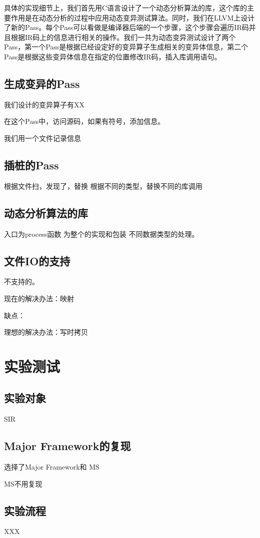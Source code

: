 \documentclass[nofonts]{ctexrep}
\begin{document}
具体的实现细节上，我们首先用C语言设计了一个动态分析算法的库，这个库的主要作用是在动态分析的过程中应用动态变异测试算法。同时，我们在LLVM上设计了新的Pass。每个Pass可以看做是编译器后端的一个步骤，这个步骤会遍历IR码并且根据IR码上的信息进行相关的操作。我们一共为动态变异测试设计了两个Pass，第一个Pass是根据已经设定好的变异算子生成相关的变异体信息，第二个Pass是根据这些变异体信息在指定的位置修改IR码，插入库调用语句。

\section{生成变异的Pass}
我们设计的变异算子有XX

在这个Pass中，访问源码，如果有符号，添加信息。

我们用一个文件记录信息

\section{插桩的Pass}
根据文件扫，发现了，替换
根据不同的类型，替换不同的库调用

\section{动态分析算法的库}
入口为process函数
为整个的实现和包装
不同数据类型的处理。

\section{文件IO的支持}
不支持的。

现在的解决办法：映射

缺点：

理想的解决办法：写时拷贝

\chapter{实验测试}
\section{实验对象}
SIR
\section{Major Framework的复现}
选择了Major Framework和 MS

MS不用复现
\section{实验流程}
XXX
\end{document}
